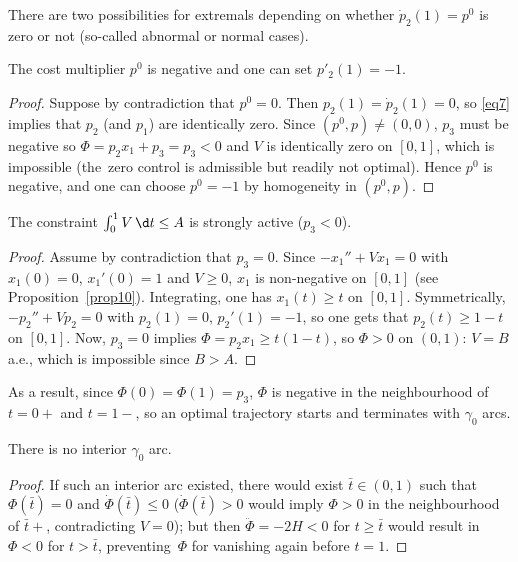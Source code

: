 There are two possibilities for
extremals depending on whether $\dot{p}_2(1)=p^0$ is zero or not (so-called abnormal
or normal cases).

\begin{lemma} \label{prop0}
The cost multiplier $p^0$ is negative and one can set $p'_2(1)=-1$.
\end{lemma}
\begin{proof} Suppose by contradiction that $p^0=0$. Then $p_2(1)=\dot{p}_2(1)=0$, so
\eqref{eq7} implies that $p_2$ (and $p_1$) are identically zero. Since $(p^0,p) \neq
(0,0)$, $p_3$ must be negative so $\Phi=p_2x_1+p_3=p_3<0$ and $V$ is identically zero
on $[0,1]$, which is impossible (the~zero control is admissible but readily not
optimal). Hence $p^0$ is negative, and one can choose $p^0=-1$ by homogeneity in
$(p^0,p)$.\end{proof}

\begin{lemma} \label{prop2}
The constraint $\int_0^1 V\,\d t \leq A$ is strongly active ($p_3<0$).
\end{lemma}
\begin{proof} Assume by contradiction that $p_3=0$.
Since $-x_1''+Vx_1=0$ with $x_1(0)=0$,
$x_1'(0)=1$ and $V \geq 0$, $x_1$ is non-negative on $[0,1]$ (see
Proposition~\ref{prop10}).
Integrating, one has $x_1(t) \geq t$ on $[0,1]$.
Symmetrically, $-p_2''+Vp_2=0$ with $p_2(1)=0$, $p_2'(1)=-1$, so
one gets that $p_2(t) \geq 1-t$ on $[0,1]$. Now, $p_3=0$ implies
$\Phi=p_2x_1 \geq t(1-t)$, so $\Phi>0$ on $(0,1)$: $V=B$ a.e., which
is impossible since $B>A$.\end{proof}
As a result, since $\Phi(0)=\Phi(1)=p_3$, $\Phi$ is negative in the neighbourhood
of $t=0+$ and $t=1-$, so an optimal trajectory starts and terminates with $\gamma_0$ arcs.

\begin{lemma} \label{lemma1}
There is no interior $\gamma_0$ arc.
\end{lemma}
\begin{proof} If such an interior arc existed, there would exist $\bar{t} \in (0,1)$
such that $\Phi(\bar{t})=0$ and $\dot{\Phi}(\bar{t}) \leq 0$ ($\dot{\Phi}(\bar{t})>0$
would imply $\Phi>0$ in the neighbourhood of $\bar{t}+$, contradicting $V=0$); but
then $\ddot{\Phi}=-2H<0$ for $t \geq \bar{t}$ would result in $\Phi<0$ for $t >
\bar{t}$, preventing~$\Phi$ for vanishing again before $t=1$.\end{proof}

